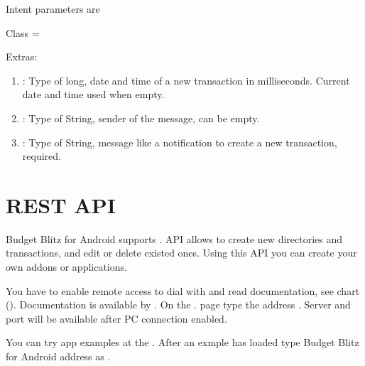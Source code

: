 \documentclass[a4paper,10pt,english]{sphinxmanual}
\begin{document}
\sphinxAtStartPar
Intent parameters are

\sphinxAtStartPar
Class = 

\sphinxAtStartPar
Extras:
\begin{enumerate}
%
\item {} 
\sphinxAtStartPar
{}: Type of long, date and time of a new transaction in milliseconds. Current date and time used when empty.

\item {} 
\sphinxAtStartPar
{}: Type of String, sender of the message, can be empty.

\item {} 
\sphinxAtStartPar
{}: Type of String, message like a notification to create a new transaction, required.

\end{enumerate}


\section{REST API}
\label{\detokenize{api:rest-api}}\label{\detokenize{api:sub-chapter-rest-api}}
\sphinxAtStartPar
Budget Blitz for Android supports . API allows to create new directories and transactions, and edit or delete existed ones. Using
this API you can create your own addons or applications.

\sphinxAtStartPar
You have to enable remote access to dial with  and read documentation, see chart {\hyperref[\detokenize{remote-access:chapter-remote-access}]{}} ().
Documentation is available by . On the . page type the address  .
Server and port will be available after PC connection enabled.

\sphinxAtStartPar
You can try app examples at the . After an exmple has loaded type Budget Blitz for Android address as .
\end{document}
